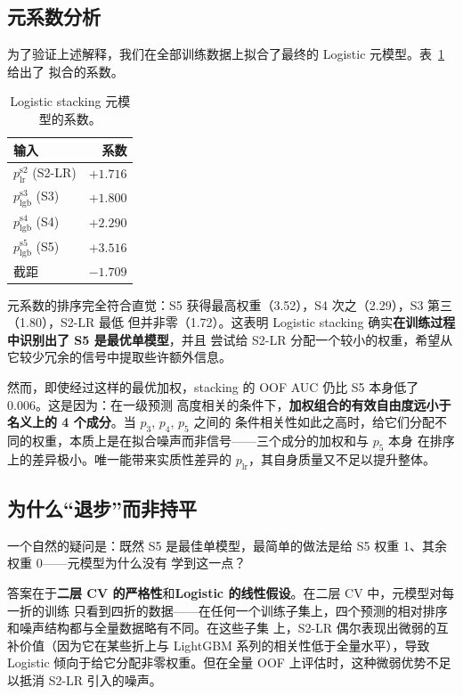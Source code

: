\documentclass[11pt,UTF8,fontset=windows]{ctexrep}
\begin{document}
\subsection{元系数分析}

为了验证上述解释，我们在全部训练数据上拟合了最终的 Logistic 元模型。表~\ref{tab:meta-coeffs} 给出了
拟合的系数。

\begin{table}[h]
\centering
\caption{Logistic stacking 元模型的系数。}
\label{tab:meta-coeffs}
\begin{tabular}{lr}
\toprule
输入 & 系数 \\
\midrule
$p_{\text{lr}}^{\text{s2}}$ (S2-LR) & $+1.716$ \\
$p_{\text{lgb}}^{\text{s3}}$ (S3)   & $+1.800$ \\
$p_{\text{lgb}}^{\text{s4}}$ (S4)   & $+2.290$ \\
$p_{\text{lgb}}^{\text{s5}}$ (S5)   & $+3.516$ \\
截距 & $-1.709$ \\
\bottomrule
\end{tabular}
\end{table}

元系数的排序完全符合直觉：S5 获得最高权重（3.52），S4 次之（2.29），S3 第三（1.80），S2-LR 最低
但并非零（1.72）。这表明 Logistic stacking 确实\textbf{在训练过程中识别出了 S5 是最优单模型}，并且
尝试给 S2-LR 分配一个较小的权重，希望从它较少冗余的信号中提取些许额外信息。

然而，即使经过这样的最优加权，stacking 的 OOF AUC 仍比 S5 本身低了 0.006。这是因为：在一级预测
高度相关的条件下，\textbf{加权组合的有效自由度远小于名义上的 4 个成分}。当 $p_3$, $p_4$, $p_5$ 之间的
条件相关性如此之高时，给它们分配不同的权重，本质上是在拟合噪声而非信号——三个成分的加权和与 $p_5$ 本身
在排序上的差异极小。唯一能带来实质性差异的 $p_{\text{lr}}$，其自身质量又不足以提升整体。

\subsection{为什么“退步”而非持平}

一个自然的疑问是：既然 S5 是最佳单模型，最简单的做法是给 S5 权重 1、其余权重 0——元模型为什么没有
学到这一点？

答案在于\textbf{二层 CV 的严格性}和\textbf{Logistic 的线性假设}。在二层 CV 中，元模型对每一折的训练
只看到四折的数据——在任何一个训练子集上，四个预测的相对排序和噪声结构都与全量数据略有不同。在这些子集
上，S2-LR 偶尔表现出微弱的互补价值（因为它在某些折上与 LightGBM 系列的相关性低于全量水平），导致
Logistic 倾向于给它分配非零权重。但在全量 OOF 上评估时，这种微弱优势不足以抵消 S2-LR 引入的噪声。
\end{document}
